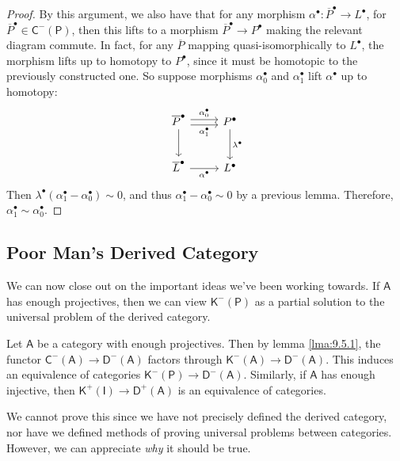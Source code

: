 \begin{proof}
By this argument, we also have that for any morphism $\alpha ^{\bullet} : \overline{P} ^{\bullet}  \to L^{\bullet} $, for $\overline{P} ^{\bullet} \in \mathsf{C} ^{-} (\mathsf{P} )$, then this lifts to a morphism $\overline{P} ^{\bullet} \to P^{\bullet} $ making the relevant diagram commute. In fact, for any $\overline{P} $ mapping quasi-isomorphically to $L^{\bullet} $, the morphism lifts up to homotopy to $P^{\bullet} $, since it must be homotopic to the previously constructed one. So suppose morphisms $\alpha _0^{\bullet} $ and $\alpha _1^{\bullet} $ lift $\alpha ^{\bullet} $ up to homotopy:
\[\begin{tikzcd}[row sep = 2.5em, column sep = 2.5em]
	\overline{P} ^{\bullet} \ar[r, shift left, "\alpha _0^{\bullet} "]\ar[r, shift right, "\alpha _1^{\bullet} "']\ar[d]&P^{\bullet} \ar[d, "\lambda ^{\bullet} "]\\
	\overline{L} ^{\bullet} \ar[r, "\alpha ^{\bullet} "']&L^{\bullet} 
\end{tikzcd}\]
Then $\lambda ^{\bullet} (\alpha _1^{\bullet} -\alpha _0^{\bullet} )\sim 0$, and thus $\alpha _1^{\bullet} -\alpha _0^{\bullet} \sim 0$ by a previous lemma. Therefore, $\alpha _1^{\bullet} \sim \alpha _0^{\bullet} $.
\end{proof}

\subsection{Poor Man's Derived Category}
We can now close out on the important ideas we've been working towards. If $\mathsf{A} $ has enough projectives, then we can view $\mathsf{K} ^{-} (\mathsf{P} )$ as a partial solution to the universal problem of the derived category.
\begin{theorem}\label{thm:9.6.2}
	Let $\mathsf{A} $ be a category with enough projectives. Then by lemma \ref{lma:9.5.1}, the functor $\mathsf{C}^{-} (\mathsf{A} )\to \mathsf{D}^{-} (\mathsf{A} )$ factors through $\mathsf{K} ^{-} (\mathsf{A} )\to \mathsf{D} ^{-} (\mathsf{A} )$. This induces an equivalence of categories $\mathsf{K} ^{-} (\mathsf{P} )\to \mathsf{D} ^{-} (\mathsf{A} )$. Similarly, if $\mathsf{A} $ has enough injective, then $\mathsf{K} ^{+}(\mathsf{I} )\to \mathsf{D} ^{+} (\mathsf{A} )$ is an equivalence of categories.
\end{theorem}

We cannot prove this since we have not precisely defined the derived category, nor have we defined methods of proving universal problems between categories. However, we can appreciate \emph{why} it should be true.

